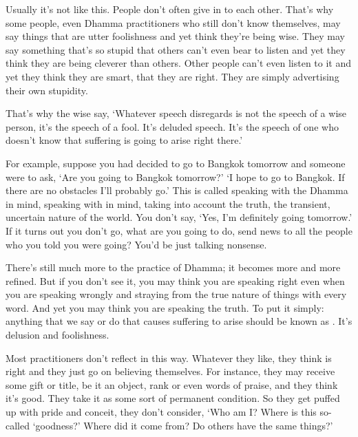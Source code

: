 Usually it's not like this. People don't often give in to each other. That's why some people, even Dhamma practitioners who still don't know themselves, may say things that are utter foolishness and yet think they're being wise. They may say something that's so stupid that others can't even bear to listen and yet they think they are being cleverer than others. Other people can't even listen to it and yet they think they are smart, that they are right. They are simply advertising their own stupidity.

That's why the wise say, `Whatever speech disregards  is not the speech of a wise person, it's the speech of a fool. It's deluded speech. It's the speech of one who doesn't know that suffering is going to arise right there.'

For example, suppose you had decided to go to Bangkok tomorrow and someone were to ask, `Are you going to Bangkok tomorrow?' `I hope to go to Bangkok. If there are no obstacles I'll probably go.' This is called speaking with the Dhamma in mind, speaking with  in mind, taking into account the truth, the transient, uncertain nature of the world. You don't say, `Yes, I'm definitely going tomorrow.' If it turns out you don't go, what are you going to do, send news to all the people who you told you were going? You'd be just talking nonsense.

There's still much more to the practice of Dhamma; it becomes more and more refined. But if you don't see it, you may think you are speaking right even when you are speaking wrongly and straying from the true nature of things with every word. And yet you may think you are speaking the truth. To put it simply: anything that we say or do that causes suffering to arise should be known as . It's delusion and foolishness.

Most practitioners don't reflect in this way. Whatever they like, they think is right and they just go on believing themselves. For instance, they may receive some gift or title, be it an object, rank or even words of praise, and they think it's good. They take it as some sort of permanent condition. So they get puffed up with pride and conceit, they don't consider, `Who am I? Where is this so-called `goodness?' Where did it come from? Do others have the same things?'

